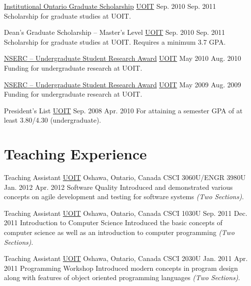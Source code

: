   \honorsAwardsEntry
    {\href{http://gradstudies.uoit.ca/test/EN/main/future\_students/awards\_and\_funding/external\_awards/OGSInstitutional.html}{Institutional Ontario
Graduate Scholarship}}
    {\href{http://uoit.ca/}{UOIT}}
    {Sep. 2010}
    {Sep. 2011}
    {Scholarship for graduate studies at UOIT.}

  \honorsAwardsEntry
    {Dean's Graduate Scholarship -- Master's Level}
    {\href{http://uoit.ca/}{UOIT}}
    {Sep. 2010}
    {Sep. 2011}
    {Scholarship for graduate studies at UOIT. Requires a minimum 3.7 GPA.}

  \honorsAwardsEntry
    {\href{http://www.nserc-crsng.gc.ca/students-etudiants/ug-pc/usra-brpc_eng.asp}{NSERC -- Undergraduate Student Research Award}}
    {\href{http://uoit.ca/}{UOIT}}
    {May 2010}
    {Aug. 2010}
    {Funding for undergraduate research at UOIT.}

  \honorsAwardsEntry
    {\href{http://www.nserc-crsng.gc.ca/students-etudiants/ug-pc/usra-brpc_eng.asp}{NSERC -- Undergraduate Student Research Award}}
    {\href{http://uoit.ca/}{UOIT}}
    {May 2009}
    {Aug. 2009}
    {Funding for undergraduate research at UOIT.}

  \honorsAwardsEntry
    {President's List}
    {\href{http://uoit.ca/}{UOIT}}
    {Sep. 2008}
    {Apr. 2010}
    {For attaining a semester GPA of at least 3.80/4.30 (undergraduate).}

  \section{Teaching Experience}

  \teachingEntry
    {Teaching Assistant}
    {\href{http://www.uoit.ca/}{UOIT}}
    {Oshawa, Ontario, Canada}
    {CSCI 3060U/ENGR 3980U}
    {Jan. 2012}
    {Apr. 2012}
    {Software Quality}
    {Introduced and demonstrated various concepts on agile development and testing for software systems \textit{(Two Sections)}.}

  \teachingEntry
    {Teaching Assistant}
    {\href{http://www.uoit.ca/}{UOIT}}
    {Oshawa, Ontario, Canada}
    {CSCI 1030U}
    {Sep. 2011}
    {Dec. 2011}
    {Introduction to Computer Science}
    {Introduced the basic concepts of computer science as well as an introduction to computer programming \textit{(Two Sections)}.}

  \teachingEntry
    {Teaching Assistant}
    {\href{http://www.uoit.ca/}{UOIT}}
    {Oshawa, Ontario, Canada}
    {CSCI 2030U}
    {Jan. 2011}
    {Apr. 2011}
    {Programming Workshop}
    {Introduced modern concepts in program design along with features of object oriented programming languages \textit{(Two Sections)}.}

